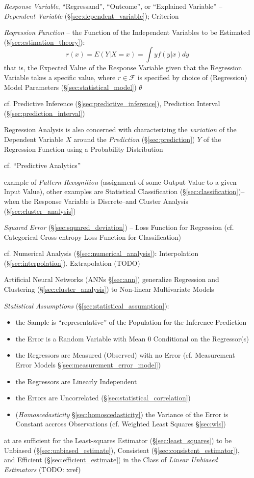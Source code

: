 \emph{Response Variable}, ``Regressand'', ``Outcome'', or ``Explained Variable''
-- \emph{Dependent Variable} (\S\ref{sec:dependent_variable}); Criterion

\emph{Regression Function} -- the Function of the Independent Variables to be
Estimated (\S\ref{sec:estimation_theory}):
\[
  r(x) = E(Y | X = x) = \int y f(y|x) dy
\]
that is, the Expected Value of the Response Variable given that the Regression
Variable takes a specific value, where $r \in \mathcal{F}$ is specified by
choice of (Regression) Model Parameters (\S\ref{sec:statistical_model}) $\theta$

\fist cf. Predictive Inference (\S\ref{sec:predictive_inference}),
Prediction Interval (\S\ref{sec:prediction_interval})

Regression Analysis is also concerned with characterizing the \emph{variation}
of the Dependent Variable $X$ around the \emph{Prediction}
(\S\ref{sec:prediction}) $Y$ of the Regression Function using a Probability
Distribution

cf. ``Predictive Analytics''

example of \emph{Pattern Recognition} (assignment of some Output Value to a
given Input Value), other examples are Statistical Classification
(\S\ref{sec:classification})--when the Response Variable is
Discrete--and Cluster Analysis (\S\ref{sec:cluster_analysis})

\emph{Squared Error} (\S\ref{sec:squared_deviation}) -- Loss Function for
Regression (cf. Categorical Cross-entropy Loss Function for Classification)

cf. Numerical Analysis (\S\ref{sec:numerical_analysis}): Interpolation
(\S\ref{sec:interpolation}), Extrapolation (TODO)

\fist Artificial Neural Networks (ANNs \S\ref{sec:ann}) generalize Regression
and Clustering (\S\ref{sec:cluster_analysis}) to Non-linear Multivariate Models

\emph{Statistical Assumptions} (\S\ref{sec:statistical_assumption}):
\begin{itemize}
  \item the Sample is ``representative'' of the Population for the Inference
    Prediction
  \item the Error is a Random Variable with Mean $0$ Conditional on the
    Regressor(s)
  \item the Regressors are Measured (Observed) with no Error (cf. Measurement
    Error Models \S\ref{sec:measurement_error_model})
  \item the Regressors are Linearly Independent
  \item the Errors are Uncorrelated (\S\ref{sec:statistical_correlation})
  \item (\emph{Homoscedasticity} \S\ref{sec:homoscedasticity}) the Variance of
    the Error is Constant accross Observations (cf. Weighted Least Squares
    \S\ref{sec:wls})
\end{itemize}
at are sufficient for the Least-squares Estimator (\S\ref{sec:least_squares}) to
be Unbiased (\S\ref{sec:unbiased_estimate}), Consistent
(\S\ref{sec:consistent_estimator}), and Efficient
(\S\ref{sec:efficient_estimate}) in the Class of \emph{Linear Unbiased
  Estimators} (TODO: xref)

